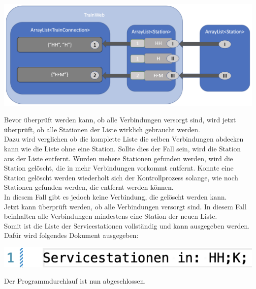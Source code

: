 \begin{center}
    \includegraphics[width=\linewidth]{images/Programmdurchlauf/Datenstruktur05.png}
    \label{test:subsecpar:datenstruktur05}
\end{center}

Bevor überprüft werden kann, ob alle Verbindungen versorgt sind, wird jetzt überprüft, ob alle Stationen der Liste wirklich gebraucht werden.\\
Dazu wird verglichen ob die komplette Liste die selben Verbindungen abdecken kann wie die Liste ohne eine Station. Sollte dies der Fall sein, wird die Station aus der Liste entfernt. Wurden mehere Stationen gefunden werden, wird die Station gelöscht, die in mehr Verbindungen vorkommt entfernt. Konnte eine Station gelöscht werden wiederholt sich der Kontrollprozess solange, wie noch Stationen gefunden werden, die entfernt werden können.\\
In diesem Fall gibt es jedoch keine Verbindung, die gelöscht werden kann.\\

Jetzt kann überprüft werden, ob alle Verbindungen versorgt sind. In diesem Fall beinhalten alle Verbindungen mindestens eine Station der neuen Liste.\\
Somit ist die Liste der Servicestationen vollständig und kann ausgegeben werden.\\

Dafür wird folgendes Dokument ausgegeben:\\
\begin{center}
    \includegraphics[width=\linewidth]{images/Programmdurchlauf/ausgabedatei.png}
    \label{test:subsecpar:ausgabedatei}
\end{center}

Der Programmdurchlauf ist nun abgeschlossen.\\